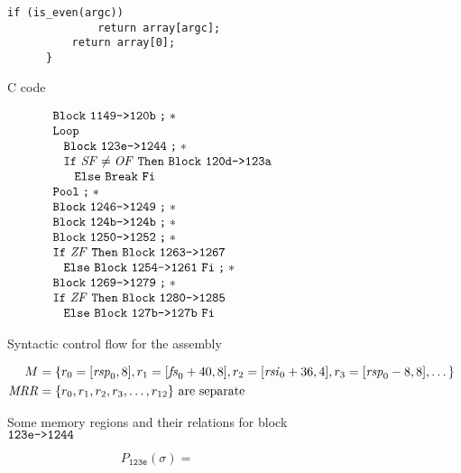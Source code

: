 \begin{figure}
\begin{subfigure}[b]{.53\linewidth}
\begin{lstlisting}[style=C, gobble=6]
          if (is_even(argc))
              return array[argc];
          return array[0];
      }
    \end{lstlisting}
    \caption{C code}\label{fig:example2-c}
  \end{subfigure}
  \hfill
  \begin{subfigure}[b]{.46\linewidth}
    \begin{equation*}
      \begin{array}{l}
        \ABB~\Block{1149}{120b}\ASeq* \\
        \AWhile \\
        \ind{2ex}\ABB~\Block{123e}{1244}\ASeq* \\
        \ind{2ex}\AIf~\var{SF}\neq\var{OF}~\AThen~\ABB~\Block{120d}{123a} \\
        \ind{4ex}\AElse~\ABreak~\AFi \\
        \AOd\ASeq* \\
        \ABB~\Block{1246}{1249}\ASeq* \\
        \ABB~\Block{124b}{124b}\ASeq* \\
        \ABB~\Block{1250}{1252}\ASeq* \\
        \AIf~\var{ZF}~\AThen~\ABB~\Block{1263}{1267} \\
        \ind{2ex}\AElse~\ABB~\Block{1254}{1261}~\AFi\ASeq* \\
        \ABB~\Block{1269}{1279}\ASeq* \\
        \AIf~\var{ZF}~\AThen~\ABB~\Block{1280}{1285} \\
        \ind{2ex}\AElse~\ABB~\Block{127b}{127b}~\AFi
      \end{array}
    \end{equation*}
    \caption{Syntactic control flow for the assembly}\label{fig:example2-scf}
  \end{subfigure}
  \begin{subfigure}{\linewidth}
    \begin{align*}
      M &=\{r_0=\region{\rspo}8, r_1=\region{\fso+40}8, r_2=\region{\rsio+36}4,
            r_3=\region{\rspo-8}8,\dotsc\} \\
      \var{MRR} &= \{r_0,r_1,r_2,r_3,\dotsc,r_{12}\}\text{ are separate}
    \end{align*}
    \caption{Some memory regions and their relations for block $\Block{123e}{1244}$}
  \end{subfigure}
  \begin{subfigure}{\linewidth}
    \begin{equation*}
      P_\mathtt{123e}(\sigma)=\begin{aligned}

\end{aligned}
\end{equation*}
\end{subfigure}
\end{figure}
